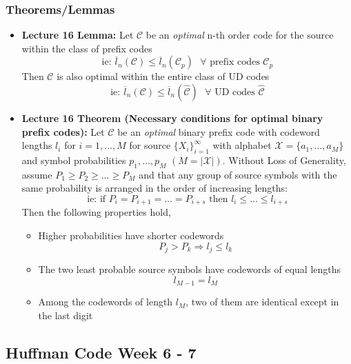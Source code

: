 \documentclass{article}
\begin{document}
\subsubsection{Theorems/Lemmas}
\begin{itemize}
    \item \textbf{Lecture 16 Lemma:} Let \(\mathcal{C}\) be an \textit{optimal} n-th order code for the source within the class of prefix codes
    \[\text{ie: } \overline{l}_n(\mathcal{C}) \leq \overline{l}_n(\mathcal{C}_p) \ \ \  \forall \text{ prefix codes } \mathcal{C}_p\]
    Then \(\mathcal{C}\) is also optimal within the entire class of UD codes
    \[\text{ie: } \overline{l}_n(\mathcal{C}) \leq \overline{l}_n(\hat{\mathcal{C}}) \ \ \  \forall \text{ UD codes } \hat{\mathcal{C}}\]
    \item \textbf{Lecture 16 Theorem (Necessary conditions for optimal binary prefix codes): } Let \(\mathcal{C}\) be an \textit{optimal} binary prefix code with codeword lengths \(l_i\) for \(i = 1, \ldots, M\) for source \(\{X_i\}^\infty_{i=1}\) with alphabet \(\mathcal{X} = \{a_1,\ldots, a_M\}\) and symbol probabilities \(p_1, \ldots, p_M\) \((M = |\mathcal{X}|)\).
    Without Loss of Generality, assume \(P_1 \geq P_2 \geq \ldots \geq P_M\) and that any group of source symbols with the same probability is arranged in the order of increasing lengths:
    \[\text{ie: if } P_i= P_{i+1} = \ldots = P_{i+s} \text{ then } l_i \leq \ldots \leq l_{i+s}\]
    Then the following properties hold,
    \begin{itemize}
        \item Higher probabilities have shorter codewords
        \[P_j > P_k \Rightarrow l_j \leq l_k\] 
        \item The two least probable source symbols have codewords of equal lengths
        \[l_{M-1} = l_{M}\]
        \item Among the codewords of length \(l_M\), two of them are identical except in the last digit
    \end{itemize}

\end{itemize}

\subsection{Huffman Code Week 6 - 7}
\end{document}
